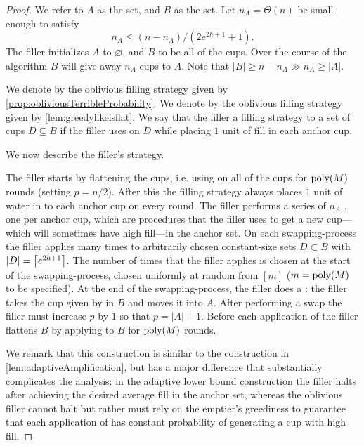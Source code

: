 \begin{proof}
  We refer to $A$ as the  set, and $B$ as the
   set. Let $n_A = \Theta(n)$ be small enough to
  satisfy
  \begin{equation}
    \label{eq:chooseBmuchbiggerthanA}
    n_A \le (n - n_A) / (2e^{2h+1} + 1).
  \end{equation}
  The filler initializes $A$ to $\varnothing$, and $B$ to be all
  of the cups. Over the course of the algorithm $B$ will give
  away $n_A$ cups to $A$. Note that $|B| \ge n-n_A \gg n_A \ge |A|$.

We denote by \randalg the oblivious filling
strategy given by \cref{prop:obliviousTerribleProbability}. 
We denote by \flatalg the oblivious filling
strategy given by \cref{lem:greedylikeisflat}.
We say that the filler  a filling strategy
\genericalg to a set of cups $D \subseteq B$ if the filler uses
\genericalg on $D$ while placing $1$ unit of fill in each anchor cup. 

We now describe the filler's strategy.

The filler starts by flattening the cups, i.e. using \flatalg on
all of the cups for $\operatorname{\text{poly}}(M)$ rounds (setting $p=n/2$). After
this the filling strategy always places $1$ unit of water in to
each anchor cup on every round. The filler performs a series of
$n_A$ , one per anchor cup, which are
procedures that the filler uses to get a new cup---which will
sometimes have high fill---in the anchor set. On each
swapping-process the filler applies \randalg many times to
arbitrarily chosen constant-size sets $D \subset B$ with $|D| =
\left\lceil e^{2h+1} \right\rceil$. The number of times that the filler applies
\randalg is chosen at the start of the swapping-process, chosen
uniformly at random from $[m]$ ($m = \operatorname{\text{poly}}(M)$ to be specified).
At the end of the swapping-process, the filler does a :
the filler takes the cup given by \randalg in $B$ and moves it
into $A$. After performing a swap the filler must increase $p$ by
$1$ so that $p=|A| + 1$. Before each application of \randalg the filler flattens
$B$ by applying \flatalg to $B$ for $\operatorname{\text{poly}}(M)$ rounds. 

We remark that this construction is similar to the construction
in \cref{lem:adaptiveAmplification}, but has a major difference
that substantially complicates the analysis: in the adaptive
lower bound construction the filler halts after achieving the
desired average fill in the anchor set, whereas the oblivious
filler cannot halt but rather must rely on the emptier's
greediness to guarantee that each application of \randalg has
constant probability of generating a cup with high fill.


\end{proof}
